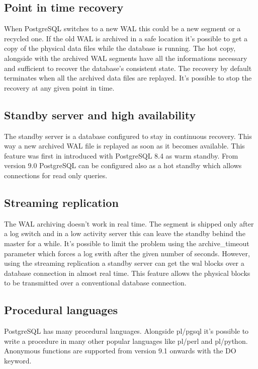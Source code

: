 \subsection{Point in time recovery}
When PostgreSQL switches to a new 
WAL this could be a new segment or a recycled one. If the old WAL is archived in a safe
location it's possible to get a copy of the physical data files while the database is running. 
The hot copy, alongside with the archived WAL segments have all the informations necessary and 
sufficient to recover the database's consistent state. The recovery by default terminates when all 
the archived data files are replayed. It's possible to stop the recovery at any given point in 
time. 

\subsection{Standby server and high availability}
The standby server is a database configured to 
stay in continuous recovery. This way a new archived WAL file is replayed as soon as it becomes 
available. This feature was first in introduced with  PostgreSQL 8.4 as warm standby. From version 9.0 PostgreSQL can be configured also as a hot standby  
which allows connections for read only queries.

\subsection{Streaming replication}
The WAL archiving doesn't work in real time. The segment is shipped only after a log switch and 
in a low activity server this can leave the standby behind the master for a while. It's  possible 
to limit the problem using the archive\_timeout parameter which forces a log swith after the given 
number of seconds. However, using the streaming replication a standby 
server can get the wal blocks over a database connection in almost real time. This feature allows 
the physical blocks to be transmitted over a conventional database connection.


\subsection{Procedural languages}
PostgreSQL has many procedural languages. Alongside pl/pgsql it's possible to write a 
procedure in many other popular languages like pl/perl and pl/python. Anonymous functions are
supported from version 9.1 onwards with the DO keyword.

